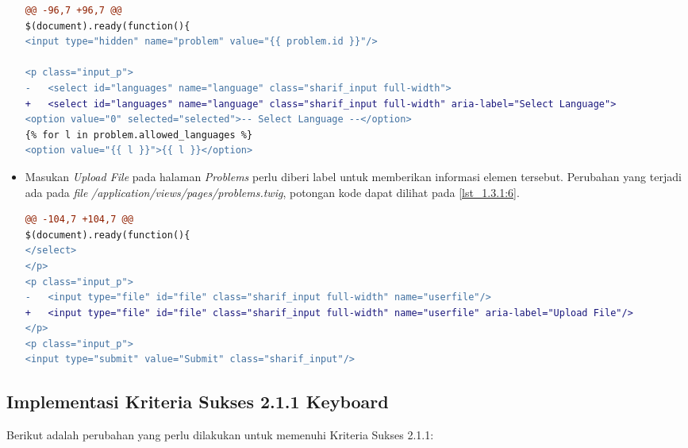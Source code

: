 \begin{itemize}
\begin{lstlisting}[language=diff, caption=Perubahan pada \textit{file} \textit{problems.twig} untuk \textit{Dropdown Select Language}, label=lst_1.3.1:5, basicstyle=\ttfamily, frame=single,
columns=fullflexible, keepspaces=true, breaklines=true]
@@ -96,7 +96,7 @@ 
$(document).ready(function(){
<input type="hidden" name="problem" value="{{ problem.id }}"/>

<p class="input_p">
- 	<select id="languages" name="language" class="sharif_input full-width">
+ 	<select id="languages" name="language" class="sharif_input full-width" aria-label="Select Language">
<option value="0" selected="selected">-- Select Language --</option>
{% for l in problem.allowed_languages %}
<option value="{{ l }}">{{ l }}</option>
\end{lstlisting}

	\item Masukan \textit{Upload File} pada halaman \textit{Problems} perlu diberi label untuk memberikan informasi elemen tersebut. Perubahan yang terjadi ada pada \textit{file} \textit{/application/views/pages/problems.twig}, potongan kode dapat dilihat pada \ref{lst_1.3.1:6}.
	
\begin{lstlisting}[language=diff, caption=Perubahan pada \textit{file} \textit{problems.twig} untuk masukan \textit{Upload \textit{file}}, label=lst_1.3.1:6, basicstyle=\ttfamily, frame=single,
columns=fullflexible, keepspaces=true, breaklines=true]
@@ -104,7 +104,7 @@ 
$(document).ready(function(){
</select>
</p>
<p class="input_p">
- 	<input type="file" id="file" class="sharif_input full-width" name="userfile"/>
+ 	<input type="file" id="file" class="sharif_input full-width" name="userfile" aria-label="Upload File"/>
</p>
<p class="input_p">
<input type="submit" value="Submit" class="sharif_input"/>
\end{lstlisting}
\end{itemize}

\subsection{Implementasi Kriteria Sukses 2.1.1 Keyboard}
\label{subsec:implementasi_A_2.1.1}
Berikut adalah perubahan yang perlu dilakukan untuk memenuhi Kriteria Sukses 2.1.1:

